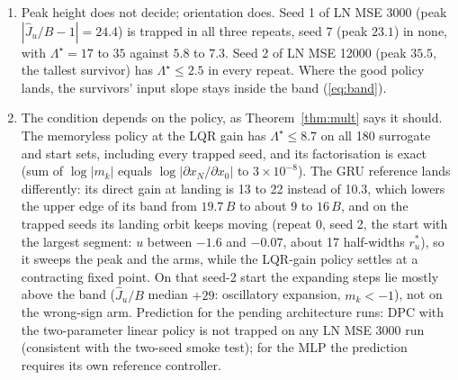 \documentclass[11pt]{article}
\theoremstyle{plainnote}
\newcommand{\Ju}{\hat J_u}
\begin{document}
\begin{enumerate}
\item Peak height does not decide; orientation does. Seed 1 of LN MSE 3000 (peak $|\Ju/B-1|=24.4$) is trapped in all three repeats, seed 7 (peak $23.1$) in none, with $\Lambda^\star=17$ to $35$ against $5.8$ to $7.3$. Seed 2 of LN MSE 12000 (peak $35.5$, the tallest survivor) has $\Lambda^\star\le2.5$ in every repeat. Where the good policy lands, the survivors' input slope stays inside the band (\ref{eq:band}).
\item The condition depends on the policy, as Theorem~\ref{thm:mult} says it should. The memoryless policy at the LQR gain has $\Lambda^\star\le8.7$ on all 180 surrogate and start sets, including every trapped seed, and its factorisation is exact (sum of $\log|m_k|$ equals $\log|\partial x_N/\partial x_0|$ to $3\times10^{-8}$). The GRU reference lands differently: its direct gain at landing is 13 to 22 instead of 10.3, which lowers the upper edge of its band from $19.7\,B$ to about $9$ to $16\,B$, and on the trapped seeds its landing orbit keeps moving (repeat 0, seed 2, the start with the largest segment: $u$ between $-1.6$ and $-0.07$, about 17 half-widths $r^*_u$), so it sweeps the peak and the arms, while the LQR-gain policy settles at a contracting fixed point. On that seed-2 start the expanding steps lie mostly above the band ($\Ju/B$ median $+29$: oscillatory expansion, $m_k<-1$), not on the wrong-sign arm. Prediction for the pending architecture runs: DPC with the two-parameter linear policy is not trapped on any LN MSE 3000 run (consistent with the two-seed smoke test); for the MLP the prediction requires its own reference controller.
\end{enumerate}
\end{document}
